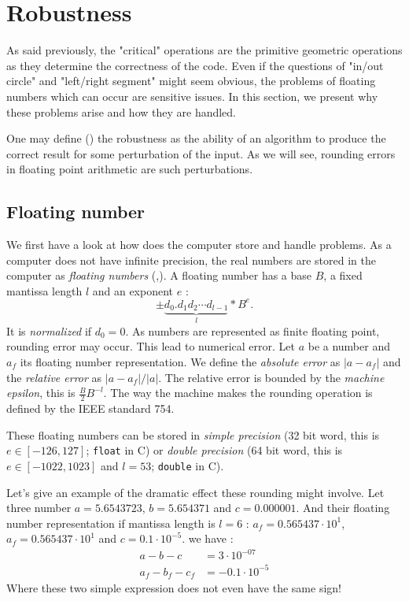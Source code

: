 \section{Robustness}
As said previously, the "critical" operations are the primitive geometric operations as they determine the correctness of the code. Even if the questions of "in/out circle" and "left/right segment" might seem obvious, the problems of floating numbers which can occur are sensitive issues. In this section, we present why these problems arise and how they are handled.

One may define (\cite{schirra}) the robustness as the ability of an algorithm to produce the correct result for some perturbation of the input. As we will see, rounding errors in floating point arithmetic are such perturbations.

\subsection{Floating number}
We first have a look at how does the computer store and handle problems. As a computer does not have infinite precision, the real numbers are stored in the computer as \textit{floating numbers} (\cite{VLegat},\cite{schirra}). A floating number has a base $B$, a fixed mantissa length $l$ and an exponent $e$ : 
\begin{equation*}
± \underbrace{d_0.d_1 d_2 \cdots d_{l-1}}_l * B^e.
\end{equation*}
It is \textit{normalized} if $d_0=0$. As numbers are represented as finite floating point, rounding error may occur. This lead to numerical error. Let $a$ be a number and $a_f$ its floating number representation. We define the \textit{absolute error} as $|a-a_f|$ and the \textit{relative error} as $|a-a_f|/|a|$. The relative error is bounded by the \textit{machine epsilon}, this is $\frac{B}{2} B^{-l}$. The way the machine makes the rounding operation is defined by the IEEE standard 754.

These floating numbers can be stored in \textit{simple precision} (32 bit word, this is $e\in [-126,127]$; \texttt{float} in C) or \textit{double precision} (64 bit word, this is $e\in [-1022,1023]$ and $l=53$; \texttt{double} in C).

Let's give an example of the dramatic effect these rounding might involve. Let three number $a=5.6543723$, $b=5.654371$ and $c=0.000001$. And their floating number representation if mantissa length is $l=6$ : $a_f=0.565437 \cdot 10^1$, $a_f=0.565437 \cdot 10^1$ and $c=0.1 \cdot 10^{-5}$. we have : 
\begin{align*}
a-b-c &= 3 \cdot 10^{-07} \\
a_f - b_f - c_f &= - 0.1 \cdot 10^{-5}
\end{align*} 
Where these two simple expression does not even have the same sign!

